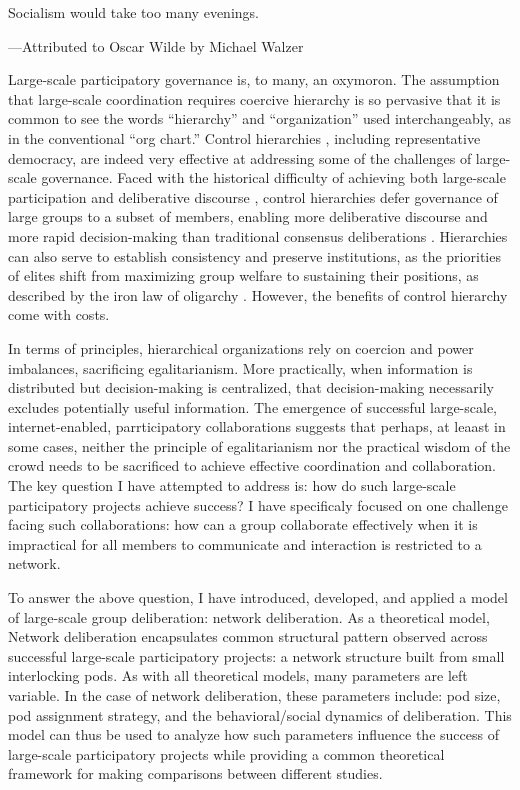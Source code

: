 \epigraph
{Socialism would take too many evenings.}
{---Attributed to Oscar Wilde by Michael Walzer \cite{walzer_day_1971} }
Large-scale participatory governance is, to many, an oxymoron.
The assumption that large-scale coordination requires coercive hierarchy is so pervasive that it is common to see the words ``hierarchy'' and ``organization'' used interchangeably, as in the conventional ``org chart.''
Control hierarchies \cite{crumley_heterarchy_1995}, including representative democracy, are indeed very effective at addressing some of the challenges of large-scale governance.
Faced with the historical difficulty of achieving both large-scale participation and deliberative discourse \cite{ackerman_deliberation_2002}, control hierarchies defer governance of large groups to a subset of members, enabling more deliberative discourse and more rapid decision-making than traditional consensus deliberations \cite{gentry_consensus_1982}.
Hierarchies can also serve to establish consistency and preserve institutions, as the priorities of elites shift from maximizing group welfare to sustaining their positions, as described by the iron law of oligarchy \cite{michels_political_1999, shaw_laboratories_2014}.
However, the benefits of control hierarchy come with costs.

In terms of principles, hierarchical organizations rely on coercion and power imbalances, sacrificing egalitarianism.
More practically, when information is distributed but decision-making is centralized,
that decision-making necessarily excludes potentially useful information.
The emergence of successful large-scale, internet-enabled, parrticipatory collaborations suggests that perhaps, at leaast in some cases, neither the principle of egalitarianism nor the practical wisdom of the crowd needs to be sacrificed to achieve effective coordination and collaboration.
The key question I have attempted to address is: how do such large-scale participatory projects achieve success?
I have specificaly focused on one challenge facing such collaborations: how can a group collaborate effectively when it is impractical for all members to communicate and interaction is restricted to a network.

To answer the above question, I have introduced, developed, and applied a model of
large-scale group deliberation: network deliberation.
As a theoretical model, Network deliberation encapsulates common structural pattern
observed across successful large-scale participatory projects:
a network structure built from small interlocking pods.
As with all theoretical models, many parameters are left variable.
In the case of network deliberation, these parameters include:
pod size, pod assignment strategy, and the behavioral/social dynamics of deliberation.
This model can thus be used to analyze how such parameters influence the success of large-scale
participatory projects while providing a common theoretical framework for making comparisons
between different studies.

